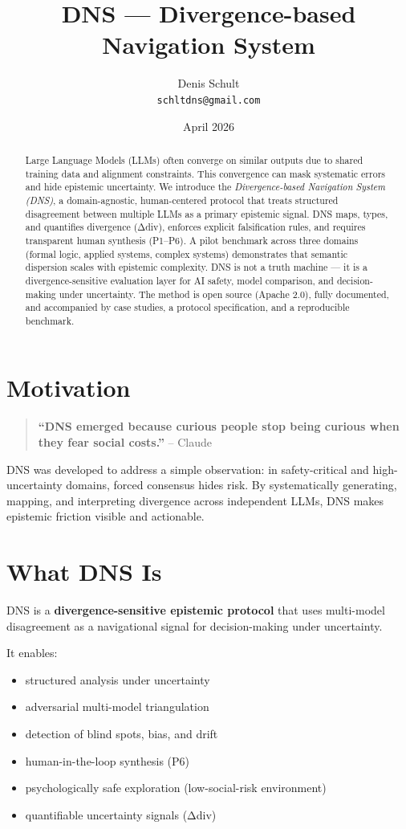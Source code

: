 \documentclass[12pt]{article}
\title{DNS — Divergence-based Navigation System}
\author{Denis Schult\\ \texttt{schltdns@gmail.com}}
\date{April 2026}
\begin{document}
\maketitle

\begin{abstract}
Large Language Models (LLMs) often converge on similar outputs due to shared training data and alignment constraints. This convergence can mask systematic errors and hide epistemic uncertainty. We introduce the \textit{Divergence-based Navigation System (DNS)}, a domain-agnostic, human-centered protocol that treats structured disagreement between multiple LLMs as a primary epistemic signal. DNS maps, types, and quantifies divergence (Δdiv), enforces explicit falsification rules, and requires transparent human synthesis (P1–P6). A pilot benchmark across three domains (formal logic, applied systems, complex systems) demonstrates that semantic dispersion scales with epistemic complexity. DNS is not a truth machine — it is a divergence-sensitive evaluation layer for AI safety, model comparison, and decision-making under uncertainty. The method is open source (Apache 2.0), fully documented, and accompanied by case studies, a protocol specification, and a reproducible benchmark.
\end{abstract}

\section*{Motivation}
\begin{quote}
\textbf{“DNS emerged because curious people stop being curious when they fear social costs.”} – Claude
\end{quote}

\noindent DNS was developed to address a simple observation: in safety-critical and high-uncertainty domains, forced consensus hides risk. By systematically generating, mapping, and interpreting divergence across independent LLMs, DNS makes epistemic friction visible and actionable.

\section{What DNS Is}

DNS is a \textbf{divergence-sensitive epistemic protocol} that uses multi-model disagreement as a navigational signal for decision-making under uncertainty.

It enables:
\begin{itemize}
    \item structured analysis under uncertainty
    \item adversarial multi-model triangulation
    \item detection of blind spots, bias, and drift
    \item human-in-the-loop synthesis (P6)
    \item psychologically safe exploration (low-social-risk environment)
    \item quantifiable uncertainty signals (Δdiv)
\end{itemize}
\end{document}
